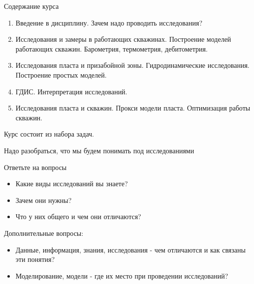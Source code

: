 \begin{frame}
    \titlepage
\end{frame}

\begin{frame}{Содержание курса}
\begin{enumerate}
    \item Введение в дисциплину. Зачем надо проводить исследования?
    \item Исследования и замеры в работающих скважинах. Построение моделей работающих скважин. Барометрия, термометрия, дебитометрия.
    \item Исследования пласта и призабойной зоны. Гидродинамические исследования. Построение простых моделей.
    \item ГДИС. Интерпретация исследований.
    \item Исследования пласта и скважин. Прокси модели пласта. Оптимизация работы скважин.
\end{enumerate}
Курс состоит из набора задач.
\end{frame}

\begin{frame}{Надо разобраться, что мы будем понимать под исследованиями}

Ответьте на вопросы
\begin{itemize}
    \item Какие виды исследований вы знаете?
    \item Зачем они нужны?
    \item Что у них общего и чем они отличаются?
\end{itemize}

Дополнительные вопросы:
\begin{itemize}
    \item Данные, информация, знания, исследования - чем отличаются и как связаны эти понятия?
    \item Моделирование, модели - где их место при проведении исследований? 
\end{itemize}

\end{frame}

